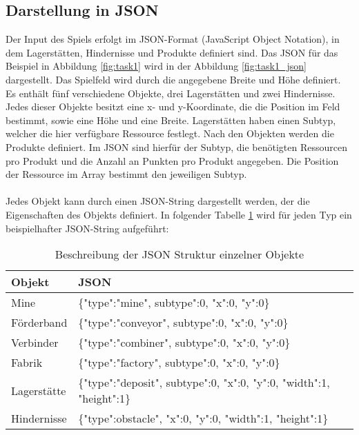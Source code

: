 \subsection{Darstellung in JSON}
Der Input des Spiels erfolgt im JSON-Format (JavaScript Object Notation), in dem Lagerstätten, Hindernisse und Produkte definiert sind. Das JSON für das Beispiel in Abbildung \ref{fig:task1} wird in der Abbildung \ref{fig:task1_json} dargestellt.
Das Spielfeld wird durch die angegebene Breite und Höhe definiert. Es enthält fünf verschiedene Objekte, drei Lagerstätten und zwei Hindernisse. Jedes dieser Objekte besitzt eine x- und y-Koordinate, die die Position im Feld bestimmt, sowie eine Höhe und eine Breite. Lagerstätten haben einen Subtyp, welcher die hier verfügbare Ressource festlegt. Nach den Objekten werden die Produkte definiert. Im JSON sind hierfür der Subtyp, die benötigten Ressourcen pro Produkt und die Anzahl an Punkten pro Produkt angegeben. Die Position der Ressource im Array bestimmt den jeweiligen Subtyp.
\\\\
Jedes Objekt kann durch einen JSON-String dargestellt werden, der die Eigenschaften des Objekts definiert. In folgender Tabelle \ref{tab:json} wird für jeden Typ ein beispielhafter JSON-String aufgeführt:

\begin{table}[htp]
	\begin{center}
		\begin{tabular}{ | l | l | } 
			\hline
			\textbf{Objekt}& \textbf{JSON}\\  \hline
			Mine & \{"type":"mine", \dq{}subtype":0, "x":0, "y":0\}\\ \hline
			Förderband & \{"type":"conveyor", \dq{}subtype":0, "x":0, "y":0\} \\ \hline
			Verbinder & \{"type":"combiner", \dq{}subtype":0, "x":0, "y":0\} \\ \hline
			Fabrik & \{"type":"factory", \dq{}subtype":0, "x":0, "y":0\}\\ \hline
			Lagerstätte & \{"type":"deposit", \dq{}subtype":0, "x":0, "y":0, "width":1, "height":1\}  \\ \hline
			Hindernisse & \{"type":\dq{}obstacle", "x":0, "y":0, "width":1, "height":1\}\\\hline
		\end{tabular}
		
		\caption{Beschreibung der JSON Struktur einzelner Objekte }\label{tab:json}
	\end{center}
\end{table}



